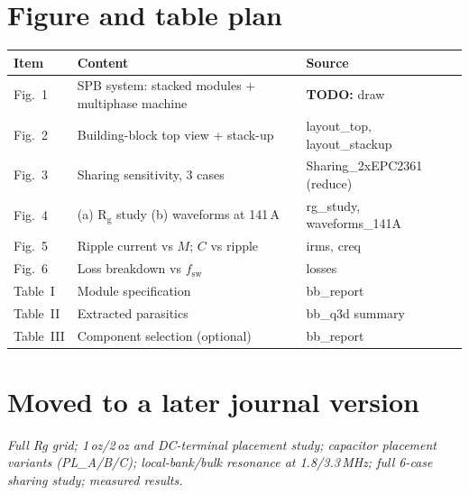 \documentclass[conference]{IEEEtran}
\newcommand{\plan}[1]{\textcolor{blue!60!black}{\textit{#1}}}
\newcommand{\todo}[1]{\textcolor{red!70!black}{\textbf{TODO:} #1}}
\begin{document}
\section*{Figure and table plan}
\begin{tabular}{@{}lll@{}}\toprule
Item & Content & Source \\\midrule
Fig.~1 & SPB system: stacked modules + multiphase machine & \todo{draw} \\
Fig.~2 & Building-block top view + stack-up & layout\_top, layout\_stackup \\
Fig.~3 & Sharing sensitivity, 3 cases & Sharing\_2xEPC2361 (reduce) \\
Fig.~4 & (a) R$_\mathrm{g}$ study (b) waveforms at 141\,A & rg\_study, waveforms\_141A \\
Fig.~5 & Ripple current vs $M$; $C$ vs ripple & irms, creq \\
Fig.~6 & Loss breakdown vs $f_\mathrm{sw}$ & losses \\
Table~I & Module specification & bb\_report \\
Table~II & Extracted parasitics & bb\_q3d summary \\
Table~III & Component selection (optional) & bb\_report \\
\bottomrule\end{tabular}

\section*{Moved to a later journal version}
\plan{Full Rg grid; 1\,oz/2\,oz and DC-terminal placement study; capacitor placement variants (PL\_A/B/C); local-bank/bulk resonance at 1.8/3.3\,MHz; full 6-case sharing study; measured results.}
\end{document}

